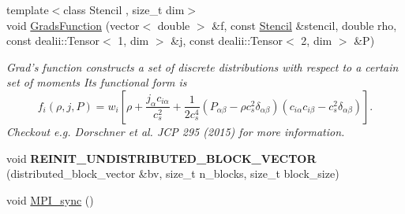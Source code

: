 \begin{DoxyCompactItemize}
\item 
\hypertarget{namespacenatrium_ad76c25c4de7488b1d117274f62d4f929}{
{\footnotesize template$<$class Stencil , size\_\-t dim$>$ }\\void \hyperlink{namespacenatrium_ad76c25c4de7488b1d117274f62d4f929}{GradsFunction} (vector$<$ double $>$ \&f, const \hyperlink{classnatrium_1_1Stencil}{Stencil} \&stencil, double rho, const dealii::Tensor$<$ 1, dim $>$ \&j, const dealii::Tensor$<$ 2, dim $>$ \&P)}
\label{namespacenatrium_ad76c25c4de7488b1d117274f62d4f929}

\begin{DoxyCompactList}\small\item\em Grad's function constructs a set of discrete distributions with respect to a certain set of moments Its functional form is \[ f_i(\rho, j, P) = w_i \left[ \rho + \frac{j_{\alpha} c_{i \alpha} }{c_s^2} + \frac{1}{2 c_s^4} \left( P_{\alpha \beta} - \rho c_s^2 \delta_{\alpha \beta} \right) \left( c_{i \alpha} c_{i \beta} - c_s^2 \delta_{\alpha \beta} \right) \right]. \] Checkout e.g. Dorschner et al. JCP 295 (2015) for more information. \item\end{DoxyCompactList}\item 
\hypertarget{namespacenatrium_a31c41694ea4808b3e801fd586bc10fef}{
void {\bfseries REINIT\_\-UNDISTRIBUTED\_\-BLOCK\_\-VECTOR} (distributed\_\-block\_\-vector \&bv, size\_\-t n\_\-blocks, size\_\-t block\_\-size)}
\label{namespacenatrium_a31c41694ea4808b3e801fd586bc10fef}

\item 
\hypertarget{namespacenatrium_ad9280c1cdcb421c6bf3f719ae2747120}{
void \hyperlink{namespacenatrium_ad9280c1cdcb421c6bf3f719ae2747120}{MPI\_\-sync} ()}
\label{namespacenatrium_ad9280c1cdcb421c6bf3f719ae2747120}


\end{DoxyCompactItemize}
